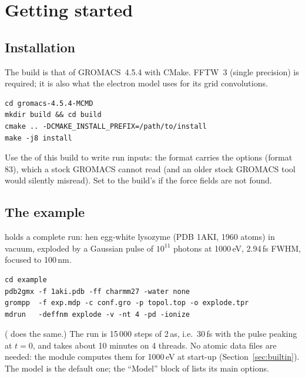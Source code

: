 \chapter{Getting started}
\label{ch:start}

\section{Installation}

The build is that of GROMACS~4.5.4 with CMake.
FFTW~3 (single precision) is required; it is also what the electron model uses for its grid convolutions.
\begin{lstlisting}
cd gromacs-4.5.4-MCMD
mkdir build && cd build
cmake .. -DCMAKE_INSTALL_PREFIX=/path/to/install
make -j8 install
\end{lstlisting}
Use the  of this build to write run inputs: the  format carries the  options
(format 83), which a stock GROMACS cannot read (and an older stock GROMACS tool would silently misread).
Set  to the build's  if the force fields are not found.

\section{The example}

 holds a complete run: hen egg-white lysozyme (PDB 1AKI, 1960 atoms) in vacuum, exploded by a
Gaussian pulse of $10^{11}$ photons at 1000\,eV, 2.94\,fs FWHM, focused to 100\,nm.
\begin{lstlisting}
cd example
pdb2gmx -f 1aki.pdb -ff charmm27 -water none
grompp  -f exp.mdp -c conf.gro -p topol.top -o explode.tpr
mdrun   -deffnm explode -v -nt 4 -pd -ionize
\end{lstlisting}
( does the same.)
The run is 15\,000 steps of 2\,as, i.e.\ 30\,fs with the pulse peaking at $t=0$, and takes about 10 minutes on 4
threads.
No atomic data files are needed: the module computes them for 1000\,eV at start-up (Section~\ref{sec:builtin}).
The model is the default one; the ``Model'' block of  lists its main options.

